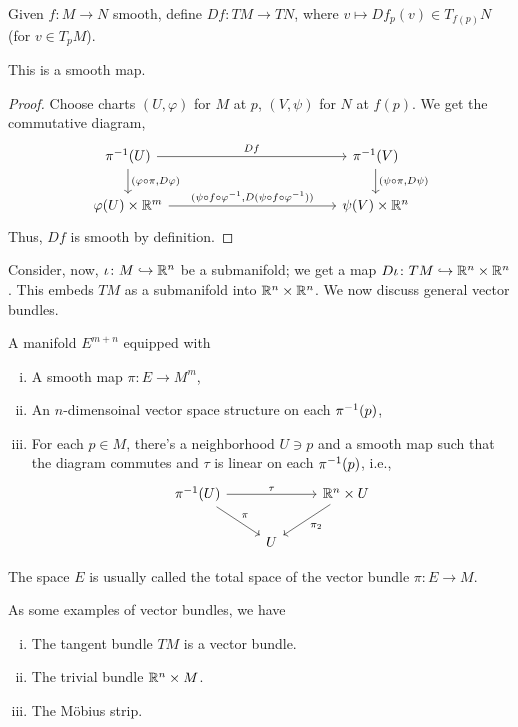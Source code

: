 \newpage
Given $f \colon M \to N$ smooth, define $Df \colon TM \to TN$, where $v \mapsto Df_p(v) \in T_{f(p)}N$ (for $v \in T_p M$).
\begin{proposition}
    This is a smooth map.
\end{proposition}
\begin{proof}
    Choose charts $(U, \varphi)$ for $M$ at $p$, $(V, \psi)$ for $N$ at $f(p)$. We get the commutative diagram,
    \[ \begin{tikzcd}[column sep=120pt]
        \pi\inv(U) \arrow[r, "Df"] \arrow[d, "(\varphi \circ \pi{,} D\varphi)"] & \pi\inv(V) \arrow[d, "(\psi \circ \pi{,} D\psi)"] \\ \varphi(U) \times \RR^m \arrow[r, "(\psi \circ f \circ \varphi\inv{,} D(\psi \circ f \circ \varphi\inv))"] & \psi(V) \times \RR^n 
    \end{tikzcd} \]
    Thus, $Df$ is smooth by definition.
\end{proof}
Consider, now, $\iota \colon M \hookrightarrow \mathbb R^n$ be a submanifold; we get a map $D \iota \colon TM \hookrightarrow \mathbb R^n \times \mathbb R^n$. This embeds $TM$ as a submanifold into $\mathbb R^n \times \mathbb R^n$. We now discuss general vector bundles.
\begin{definition}
    A manifold $E^{m+n}$ equipped with
    \begin{enumerate}[(i)]
        \item A smooth map $\pi \colon E \to M^m$,
        \item An $n$-dimensoinal vector space structure on each $\pi^{-1}(p)$,
        \item For each $p \in M$, there's a neighborhood $U \ni p$ and a smooth map such that the diagram commutes and $\tau$ is linear on each $\pi^{-1}(p)$, i.e.,
        \[ \begin{tikzcd} \pi\inv(U) \arrow[rr, "\tau"] \arrow[dr, "\pi"] & & \RR^n \times U \arrow[dl, "\pi_2"] \\ & U \end{tikzcd} \]
    \end{enumerate}
    The space $E$ is usually called the total space of the vector bundle $\pi \colon E \to M$.
\end{definition}
As some examples of vector bundles, we have
\begin{enumerate}[(i)]
    \item The tangent bundle $TM$ is a vector bundle.
    \item The trivial bundle $\mathbb R^n \times M$.
    \item The M\"obius strip.
\end{enumerate}
